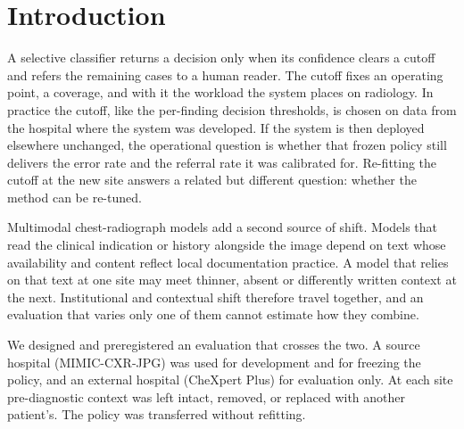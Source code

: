 \section{Introduction}
\label{sec:intro}

A selective classifier returns a decision only when its confidence clears a
cutoff and refers the remaining cases to a human reader. The cutoff fixes an
operating point, a coverage, and with it the workload the system places on
radiology. In practice the cutoff, like the per-finding decision thresholds, is
chosen on data from the hospital where the system was developed. If the
system is then deployed elsewhere unchanged, the operational question is
whether that frozen policy still delivers the error rate and the referral rate
it was calibrated for. Re-fitting the cutoff at the new site answers a related
but different question: whether the method can be re-tuned.

Multimodal chest-radiograph models add a second source of shift. Models that
read the clinical indication or history alongside the image depend on text
whose availability and content reflect local documentation practice. A model
that relies on that text at one site may meet thinner, absent or differently
written context at the next. Institutional and contextual shift therefore
travel together, and an evaluation that varies only one of them cannot
estimate how they combine.

We designed and preregistered an evaluation that crosses the two. A source
hospital (MIMIC-CXR-JPG) was used for development and for freezing the policy,
and an external hospital (CheXpert Plus) for evaluation only. At each site
pre-diagnostic context was left intact, removed, or replaced with another
patient's. The policy was transferred without refitting.

